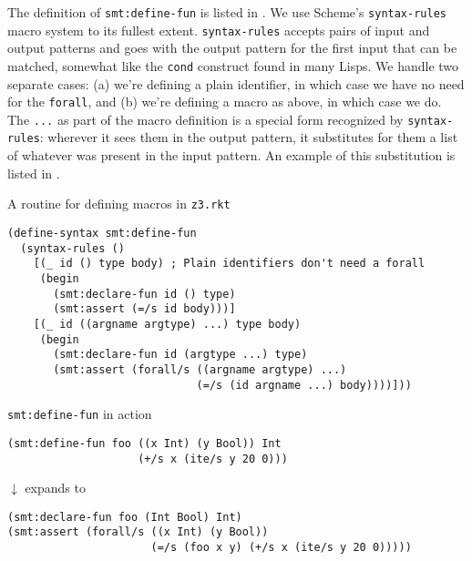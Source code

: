 The definition of \texttt{smt:define-fun} is listed in .
We use Scheme's \texttt{syntax-rules} macro system \cite[Section~4.3.2]{scheme-r5rs}
to its fullest extent. \texttt{syntax-rules} accepts pairs of input and output
patterns and goes with the output pattern for the first input that can be
matched, somewhat like the \texttt{cond} construct found in many Lisps. We
handle two separate cases: (a) we're defining a plain identifier, in which
case we have no need for the \texttt{forall}, and (b) we're defining a macro
as above, in which case we do. The \texttt{...} as part of the macro
definition is a special form recognized by \texttt{syntax-rules}: wherever it
sees them in the output pattern, it substitutes for them a list of whatever
was present in the input pattern. An example of this substitution is listed in
.

\begin{program}
\caption{A routine for defining macros in \texttt{z3.rkt}}
\label{fig:define-fun}
\begin{verbatim}
(define-syntax smt:define-fun
  (syntax-rules ()
    [(_ id () type body) ; Plain identifiers don't need a forall
     (begin
       (smt:declare-fun id () type)
       (smt:assert (=/s id body)))]
    [(_ id ((argname argtype) ...) type body)
     (begin
       (smt:declare-fun id (argtype ...) type)
       (smt:assert (forall/s ((argname argtype) ...)
                             (=/s (id argname ...) body))))]))
\end{verbatim}
\end{program}

\begin{program}
\caption{\texttt{smt:define-fun} in action}
\label{fig:define-fun-example}

\begin{verbatim}
(smt:define-fun foo ((x Int) (y Bool)) Int
                    (+/s x (ite/s y 20 0)))
\end{verbatim}

\begin{center}
{\large $\downarrow$} {\small expands to}
\end{center}

\begin{verbatim}
(smt:declare-fun foo (Int Bool) Int)
(smt:assert (forall/s ((x Int) (y Bool))
                      (=/s (foo x y) (+/s x (ite/s y 20 0)))))
\end{verbatim}
\end{program}


